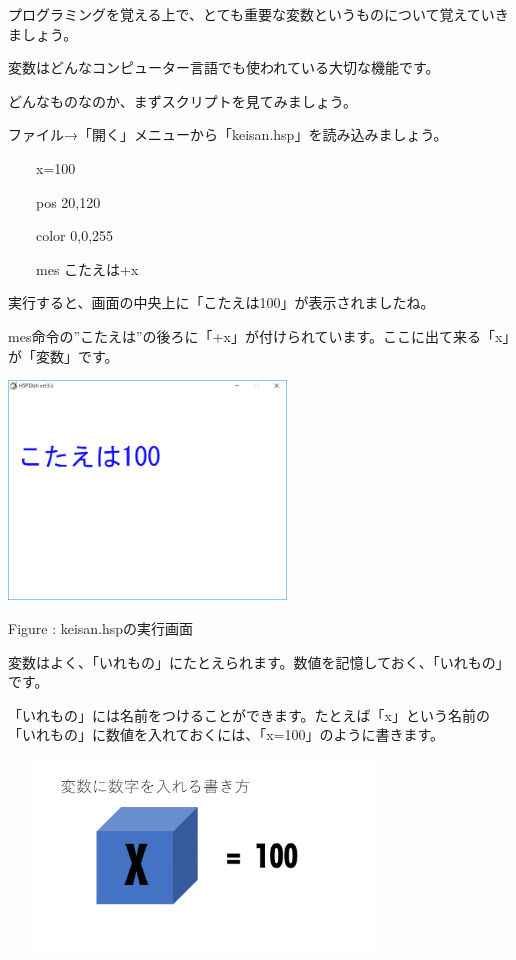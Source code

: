 \documentclass[a4paper,12pt]{jarticle}
\newcounter{Figure}
\renewcommand\theFigure{\arabic{Figure}}
\begin{document}
プログラミングを覚える上で、とても重要な変数というものについて覚えていきましょう。

変数はどんなコンピューター言語でも使われている大切な機能です。

どんなものなのか、まずスクリプトを見てみましょう。

ファイル→「開く」メニューから「keisan.hsp」を読み込みましょう。


\bigskip

\ \ \ \ x=100

\ \ \ \ pos 20,120

\ \ \ \ color 0,0,255

\ \ \ \ mes {\textquotedbl}こたえは{\textquotedbl}+x


\bigskip

実行すると、画面の中央上に「こたえは100」が表示されましたね。

mes命令の”こたえは”の後ろに「+x」が付けられています。ここに出て来る「x」が「変数」です。

\bigskip
\bigskip

\begin{minipage}{9.781cm}
\centering
{\upshape
\includegraphics[keepaspectratio,width=7.382cm,height=5.831cm]{text02-img/text02-img044.png}
\flushleft

Figure \stepcounter{Figure}{\theFigure}: keisan.hspの実行画面}
\end{minipage}

\bigskip
\bigskip
\bigskip

変数はよく、「いれもの」にたとえられます。数値を記憶しておく、「いれもの」です。

「いれもの」には名前をつけることができます。たとえば「x」という名前の「いれもの」に数値を入れておくには、「x=100」のように書きます。

\bigskip
\bigskip

\begin{minipage}{9.781cm}
\centering
{\upshape
\includegraphics[keepaspectratio,width=10.478cm,height=5.106cm]{text02-img/text02-img045.png}}
\end{minipage}
\end{document}
